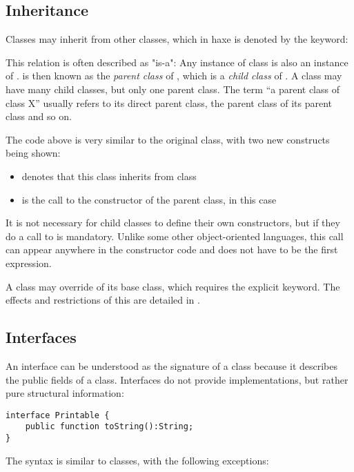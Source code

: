 \documentclass{haxe}
\begin{document}
\subsection{Inheritance}
\label{types-class-inheritance}

Classes may inherit from other classes, which in haxe is denoted by the  keyword:

This relation is often described as "is-a": Any instance of class  is also an instance of .  is then known as the \emph{parent class} of , which is a \emph{child class} of . A class may have many child classes, but only one parent class. The term ``a parent class of class X'' usually refers to its direct parent class, the parent class of its parent class and so on.

The code above is very similar to the original  class, with two new constructs being shown:
\begin{itemize}
 \item {} denotes that this class inherits from class 
 \item {} is the call to the constructor of the parent class, in this case 
\end{itemize}
It is not necessary for child classes to define their own constructors, but if they do a call to  is mandatory. Unlike some other object-oriented languages, this call can appear anywhere in the constructor code and does not have to be the first expression.

A class may override  of its base class, which requires the explicit  keyword. The effects and restrictions of this are detailed in .


\subsection{Interfaces}
\label{types-interfaces}

An interface can be understood as the signature of a class because it describes the public fields of a class. Interfaces do not provide implementations, but rather pure structural information:

\begin{lstlisting}
interface Printable {
	public function toString():String;
}
\end{lstlisting}
The syntax is similar to classes, with the following exceptions:
\end{document}
